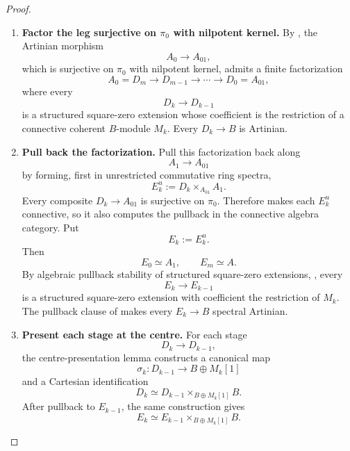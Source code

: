\begin{proof}
\leavevmode
\begin{enumerate}[label=\textup{(\arabic*)}]
    \item \textbf{Factor the leg surjective on \(\pi_0\) with nilpotent kernel.}
    By
    , the Artinian morphism
    \[
        A_0\longrightarrow A_{01},
    \]
    which is surjective on \(\pi_0\) with nilpotent kernel, admits a finite
    factorization
    \[
        A_0=D_m
        \longrightarrow
        D_{m-1}
        \longrightarrow
        \cdots
        \longrightarrow
        D_0=A_{01},
    \]
    where every
    \[
        D_k\longrightarrow D_{k-1}
    \]
    is a structured square-zero extension whose coefficient is the restriction of
    a connective coherent \(B\)-module \(M_k\). Every \(D_k\to B\) is
    Artinian.
    \item \textbf{Pull back the factorization.}
    Pull this factorization back along
    \[
        A_1\longrightarrow A_{01}
    \]
    by forming, first in unrestricted commutative ring spectra,
    \[
        E_k^u:=D_k\times_{A_{01}}A_1.
    \]
    Every composite \(D_k\to A_{01}\) is surjective on \(\pi_0\). Therefore
     makes each \(E_k^u\) connective,
    so it also computes the pullback in the connective algebra category. Put
    \[
        E_k:=E_k^u.
    \]
    Then
    \[
        E_0\simeq A_1,
        \qquad
        E_m\simeq A.
    \]
    By algebraic pullback stability of structured square-zero extensions,
    , every
    \[
        E_k\longrightarrow E_{k-1}
    \]
    is a structured square-zero extension with coefficient the restriction of
    \(M_k\). The pullback clause of
     makes every
    \(E_k\to B\) spectral Artinian.
    \item \textbf{Present each stage at the centre.}
    For each stage
    \[
        D_k\longrightarrow D_{k-1},
    \]
    the centre-presentation lemma
     constructs a canonical map
    \[
        \sigma_k:
        D_{k-1}
        \longrightarrow
        B\oplus M_k[1]
    \]
    and a Cartesian identification
    \[
        D_k
        \simeq
        D_{k-1}
        \times_{B\oplus M_k[1]}
        B.
    \]
    After pullback to \(E_{k-1}\), the same construction gives
    \[
        E_k
        \simeq
        E_{k-1}
        \times_{B\oplus M_k[1]}
        B.
    \]

\end{enumerate}
\end{proof}
